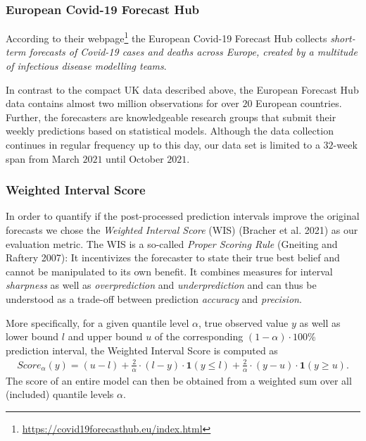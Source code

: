 \documentclass[
]{article}
\DeclareRobustCommand{\href}[2]{#2\footnote{\url{#1}}}
\begin{document}
\hypertarget{european-covid-19-forecast-hub}{%
\subsubsection{European Covid-19 Forecast Hub}\label{european-covid-19-forecast-hub}}

According to their \href{https://covid19forecasthub.eu/index.html}{webpage} the European Covid-19 Forecast Hub collects \emph{short-term forecasts of Covid-19 cases and deaths across Europe, created by a multitude of infectious disease modelling teams}.

In contrast to the compact UK data described above, the European Forecast Hub data contains almost two million observations for over \(20\) European countries.
Further, the forecasters are knowledgeable research groups that submit their weekly predictions based on statistical models.
Although the data collection continues in regular frequency up to this day, our data set is limited to a \(32\)-week span from March \(2021\) until October \(2021\).

\hypertarget{weighted-interval-score}{%
\subsubsection{Weighted Interval Score}\label{weighted-interval-score}}

In order to quantify if the post-processed prediction intervals improve the original forecasts we chose the \emph{Weighted Interval Score} (WIS) (Bracher et al. 2021) as our evaluation metric.
The WIS is a so-called \emph{Proper Scoring Rule} (Gneiting and Raftery 2007): It incentivizes the forecaster to state their true best belief and cannot be manipulated to its own benefit.
It combines measures for interval \emph{sharpness} as well as \emph{overprediction} and \emph{underprediction} and can thus be understood as a trade-off between prediction \emph{accuracy} and \emph{precision}.

More specifically, for a given quantile level \(\alpha\), true observed value \(y\) as well as lower bound \(l\) and upper bound \(u\) of the corresponding \((1 - \alpha) \cdot 100\)\% prediction interval, the Weighted Interval Score is computed as
\[
\begin{align}
Score_\alpha(y) = (u-l) + \frac{2}{\alpha} \cdot (l-y) \cdot \mathbf{1} (y \leq l) + \frac{2}{\alpha} \cdot (y-u) \cdot \mathbf{1}(y \geq u).
\end{align}
\]
The score of an entire model can then be obtained from a weighted sum over all (included) quantile levels \(\alpha\).
\end{document}
